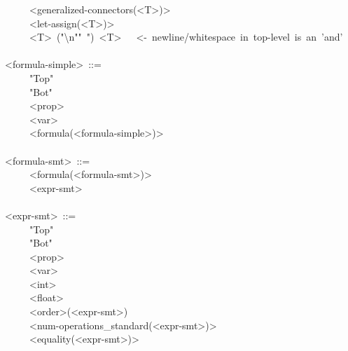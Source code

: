\begin{footnotesize}
\begin{mdpre}
~~~~\textbar{}~{\textless{}generalized-connectors(\textless{}T\textgreater{})\textgreater{}}\\
~~~~\textbar{}~{\textless{}let-assign(\textless{}T\textgreater{})\textgreater{}}\\
~~~~\textbar{}~{\textless{}T\textgreater{}}~("\textbackslash{}n"\textbar{}"~")~{\textless{}T\textgreater{}}~~~{\textless{}-~newline/whitespace~in~top-level~is~an~'and'}\\
\\
{\textless{}formula-simple\textgreater{}}~::=\\
~~~~\textbar{}~"Top"\\
~~~~\textbar{}~"Bot"\\
~~~~\textbar{}~{\textless{}prop\textgreater{}}\\
~~~~\textbar{}~{\textless{}var\textgreater{}}\\
~~~~\textbar{}~{\textless{}formula(\textless{}formula-simple\textgreater{})\textgreater{}}\\
\\
{\textless{}formula-smt\textgreater{}}~::=\\
~~~~\textbar{}~{\textless{}formula(\textless{}formula-smt\textgreater{})\textgreater{}}\\
~~~~\textbar{}~{\textless{}expr-smt\textgreater{}}\\
\\
{\textless{}expr-smt\textgreater{}}~::=\\
~~~~\textbar{}~"Top"\\
~~~~\textbar{}~"Bot"\\
~~~~\textbar{}~{\textless{}prop\textgreater{}}\\
~~~~\textbar{}~{\textless{}var\textgreater{}}\\
~~~~\textbar{}~{\textless{}int\textgreater{}}\\
~~~~\textbar{}~{\textless{}float\textgreater{}}\\
~~~~\textbar{}~{\textless{}order\textgreater{}(\textless{}expr-smt\textgreater{}})\\
~~~~\textbar{}~\textless{}num-operations\_standard({\textless{}expr-smt\textgreater{})\textgreater{}}\\
~~~~\textbar{}~{\textless{}equality(\textless{}expr-smt\textgreater{})\textgreater{}}\\

\end{mdpre}
\end{footnotesize}
